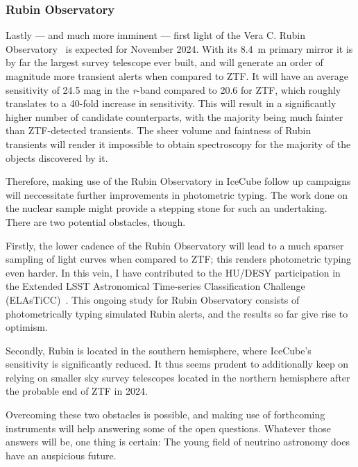 \subsubsection{Rubin Observatory}
Lastly --- and much more imminent --- first light of the Vera C. Rubin Observatory~\cite{Ivezic2019} is expected for November 2024. With its \SI{8.4}{\m} primary mirror it is by far the largest survey telescope ever built, and will generate an order of magnitude more transient alerts when compared to ZTF. It will have an average sensitivity of 24.5 mag in the \textit{r}-band compared to 20.6 for ZTF, which roughly translates to a 40-fold increase in sensitivity. This will result in a significantly higher number of candidate counterparts, with the majority being much fainter than ZTF-detected transients. The sheer volume and faintness of Rubin transients will render it impossible to obtain spectroscopy for the majority of the objects discovered by it.

Therefore, making use of the Rubin Observatory in IceCube follow up campaigns will neccessitate further improvements in photometric typing. The work done on the nuclear sample might provide a stepping stone for such an undertaking. There are two potential obstacles, though.

Firstly, the lower cadence of the Rubin Observatory will lead to a much sparser sampling of light curves when compared to ZTF; this renders photometric typing even harder. In this vein, I have contributed to the HU/DESY participation in the Extended LSST Astronomical Time-series Classification Challenge (ELAsTiCC)~. This ongoing study for Rubin Observatory consists of photometrically typing simulated Rubin alerts, and the results so far give rise to optimism.

Secondly, Rubin is located in the southern hemisphere, where IceCube's sensitivity is significantly reduced. It thus seems prudent to additionally keep on relying on smaller sky survey telescopes located in the northern hemisphere after the probable end of ZTF in 2024.

Overcoming these two obstacles is possible, and making use of forthcoming instruments will help answering some of the open questions. Whatever those answers will be, one thing is certain: The young field of neutrino astronomy does have an auspicious future.